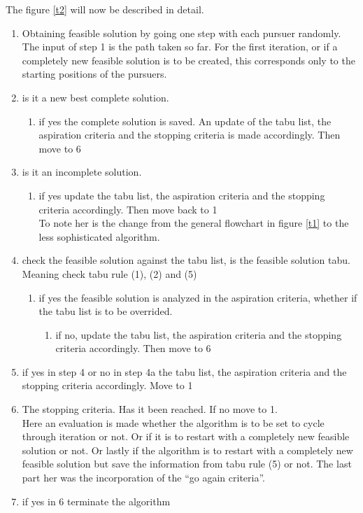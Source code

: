 The figure \ref{t2} will now be described in detail.
\begin{enumerate}
\item{}Obtaining feasible solution by going one step with each pursuer randomly. \vspace{0,1cm}\\ 
The input of step 1 is the path taken so far. For the first iteration, or if a completely new feasible solution is to be created, this corresponds only to the starting positions of the pursuers. 
\item{} is it a new best complete solution.
\begin{enumerate}
\item{} if yes the complete solution is saved. An update of the tabu list, the aspiration criteria and the stopping criteria is made accordingly. Then move to 6
\end{enumerate}
\item{} is it an incomplete solution.
\begin{enumerate}
\item{} if yes update the tabu list, the aspiration criteria and the stopping criteria accordingly. Then move back to 1 \vspace{0,1cm}\\
To note her is the change from the general flowchart in figure \ref{t1} to the less sophisticated algorithm. 
\end{enumerate}
\item{} check the feasible solution against the tabu list, is the feasible solution tabu. \vspace{0,1cm}\\
Meaning check tabu rule (1), (2) and (5)
\begin{enumerate}
\item{} if yes the feasible solution is analyzed in the aspiration criteria, whether if the tabu list is to be overrided.
 \begin{enumerate}
\item{} if no, update the tabu list, the aspiration criteria and the stopping criteria accordingly. Then move to 6
\end{enumerate}
\end{enumerate}
\item{} if yes in step 4 or no in step 4a the tabu list, the aspiration criteria and the stopping criteria accordingly. Move to 1
\item{} The stopping criteria. Has it been reached. If no move to 1. \vspace{0,1cm}\\
Here an evaluation is made whether the algorithm is to be set to cycle through iteration or not. Or if it is to restart with a completely new feasible solution or not. 
Or lastly if the algorithm is to restart with a completely new feasible solution but save the information from tabu rule (5) or not. The last part her was the incorporation of the ``go again criteria''.
\item{} if yes in 6 terminate the algorithm
\end{enumerate}

